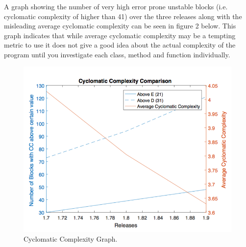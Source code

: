 \documentclass[10.5pt,journal, a4paper]{IEEEtran}
\begin{document}
\noindent
A graph showing the number of very high error prone unstable blocks (i.e. cyclomatic complexity of higher than 41) over the three releases along with the misleading average cyclomatic complexity can be seen in figure 2 below. This graph indicates that while average cyclomatic complexity may be a tempting metric to use it does not give a good idea about the actual complexity of the program until you investigate each class, method and function individually. 


 \begin{figure}[H]
 \centering 
 \includegraphics[width=\columnwidth]{CCcomp}
 \centering 
  \caption {Cyclomatic Complexity Graph. }
 \end{figure}



\end{document}
